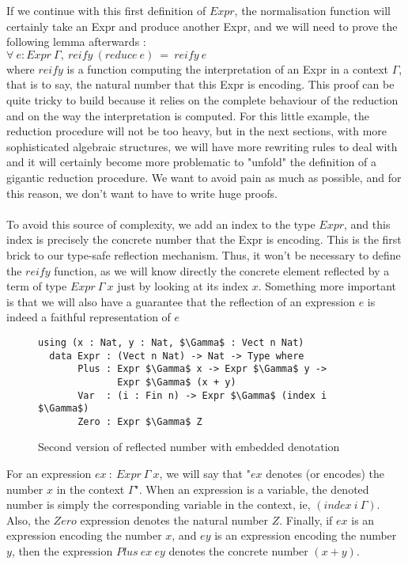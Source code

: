 If we continue with this first definition of $Expr$, the normalisation function will certainly take an Expr and produce another Expr, and we will need to prove the following lemma afterwards : \\
$\forall\ e:Expr\ \Gamma,\ reify\ (reduce\ e)\ =\ reify\ e$ \\
where $reify$ is a function computing the interpretation of an Expr in a context $\Gamma$, that is to say, the natural number that this Expr is encoding.
This proof can be quite tricky to build because it relies on the complete behaviour of the reduction and on the way the interpretation is computed.
For this little example, the reduction procedure will not be too heavy, but in the next sections, with more sophisticated algebraic structures, we will have more rewriting rules to deal with and it will certainly become more problematic to "unfold" the definition of a gigantic reduction procedure. We want to avoid pain as much as possible, and for this reason, we don't want to have to write huge proofs. \\
\\
To avoid this source of complexity, we add an index to the type $Expr$, and this index is precisely the concrete number that the Expr is encoding. This is the first brick to our type-safe reflection mechanism. Thus, it won't be necessary to define the $reify$ function, as we will know directly the concrete element reflected by a term of type $Expr\ \Gamma\ x$ just by looking at its index $x$. Something more important is that we will also have a guarantee that the reflection of an expression $e$ is indeed a faithful representation of $e$ \\

\begin{figure}[H]
\figrule
\begin{center}
\begin{lstlisting}
using (x : Nat, y : Nat, $\Gamma$ : Vect n Nat)
  data Expr : (Vect n Nat) -> Nat -> Type where
       Plus : Expr $\Gamma$ x -> Expr $\Gamma$ y -> 
              Expr $\Gamma$ (x + y)
       Var  : (i : Fin n) -> Expr $\Gamma$ (index i $\Gamma$)
       Zero : Expr $\Gamma$ Z
\end{lstlisting}
\end{center}
\caption{Second version of reflected number with embedded denotation}
\figrule
\end{figure}

For an expression $ex\ :\ Expr\ \Gamma\ x$, we will say that "$ex$ denotes (or encodes) the number $x$ in the context $\Gamma$".
When an expression is a variable, the denoted number is simply the corresponding variable in the context, ie, $(index\ i\ \Gamma)$.
Also, the $Zero$ expression denotes the natural number $Z$.
Finally, if $ex$ is an expression encoding the number $x$, and $ey$ is an expression encoding the number $y$, then the expression $Plus\ ex\ ey$ denotes the concrete number $(x + y)$.


